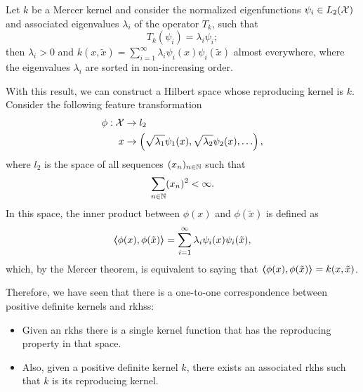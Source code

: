\begin{theorem}    
Let $k$ be a Mercer kernel and consider the normalized eigenfunctions $\psi_i \in L_2(\mathcal{X})$ and associated eigenvalues $\lambda_i$ of the operator $T_k$, such that
$$ T_k(\psi_i) = \lambda_i \psi_i ; $$
then $\lambda_i > 0$ and $k(x, \tilde{x}) = \sum_{i=1}^\infty \lambda_i \psi_i(x) \psi_i(\tilde{x})$ almost everywhere, where the eigenvalues $\lambda_i$ are sorted in non-increasing order. 
\end{theorem}
%
With this result, we can construct a Hilbert space whose reproducing kernel is $k$.
Consider the following feature transformation
\begin{equation}
    \begin{aligned}
        \nonumber
        \phi: \mathcal{X} &\to l_2 \\
        x &\to \left(\sqrt{\lambda_1} \psi_1(x), \sqrt{\lambda_2} \psi_2(x), \ldots \right) ,
    \end{aligned}
\end{equation}
where $l_2$ is the space of all sequences $(x_n)_{n \in \mathbb{N}}$ such that $$ \sum_{n \in \mathbb{N}} (x_n)^2 < \infty .$$
In this space, the inner product between $\phi(x)$ and $\phi(\tilde{x})$ is defined as
$$ \bm{\left\langle} \phi(x), \phi(\tilde{x}) \bm{\right\rangle} = \sum_{i=1}^\infty \lambda_i \psi_i(x) \psi_i(\tilde{x}),$$ which, by the Mercer theorem, is equivalent to saying that $\bm{\left\langle} \phi(x), \phi(\tilde{x}) \bm{\right\rangle} = k(x, \tilde{x})$.

Therefore, we have seen that there is a one-to-one correspondence between positive definite kernels and \acrshort{rkhss}: 
\begin{itemize}
    \item Given an \acrshort{rkhs} there is a single kernel function that has the reproducing property in that space.
    \item Also, given a positive definite kernel $k$, there exists an associated \acrshort{rkhs} such that $k$ is its reproducing kernel. 
\end{itemize}










